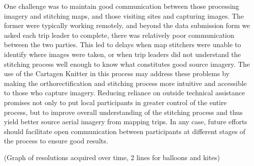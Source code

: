 \documentclass[11pt,oneside,notitlepage]{report}
\begin{document}
One challenge was to maintain good communication between those processing imagery and stitching maps, and those visiting sites and capturing images. The former were typically working remotely, and beyond the data submission form we asked each trip leader to complete, there was relatively poor communication between the two parties. This led to delays when map stitchers were unable to identify where images were taken, or when trip leaders did not understand the stitching process well enough to know what constitutes good source imagery. The use of the Cartagen Knitter in this process may address these problems by making the orthorectification and stitching process more intuitive and accessible to those who capture imagery. Reducing reliance on outside technical assistance promises not only to put local participants in greater control of the entire process, but to improve overall understanding of the stitching process and thus yield better source aerial imagery from mapping trips. In any case, future efforts should facilitate open communication between participants at different stages of the process to ensure good results.

(Graph of resolutions acquired over time, 2 lines for balloons and kites)
\end{document}
